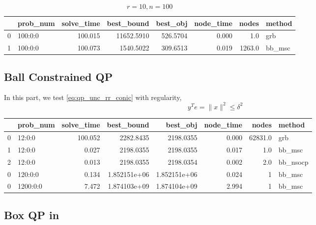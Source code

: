 \documentclass[a4paper, 10pt]{article}
\begin{document}
\begin{table}[h!]
    \begin{tabular}{llrrrrrl}
        \toprule
        {} & prob\_num & solve\_time & best\_bound & best\_obj & node\_time & nodes  & method  \\
        \midrule
        0  & 100:0:0   & 100.015     & 11652.5910  & 526.5704  & 0.000      & 1.0    & grb     \\
        1  & 100:0:0   & 100.073     & 1540.5022   & 309.6513  & 0.019      & 1263.0 & bb\_msc \\
        \bottomrule
    \end{tabular}
    \caption{\(r=10, n=100\)}
\end{table}
\normalsize

\subsection{Ball Constrained QP}
In this part, we test \eqref{eq:qp_unc_rr_conic} with regularity,
\begin{equation}
    y^Te = \|x\|^2 \le \delta^2
\end{equation}
\scriptsize
\begin{table}[h!]
    \begin{tabular}{llrrrrrl}
        \toprule
        {} & prob\_num & solve\_time & best\_bound  & best\_obj    & node\_time & nodes   & method    \\
        \midrule
        0  & 12:0:0    & 100.052     & 2282.8435    & 2198.0355    & 0.000      & 62831.0 & grb       \\
        1  & 12:0:0    & 0.027       & 2198.0355    & 2198.0355    & 0.017      & 1.0     & bb\_msc   \\
        2  & 12:0:0    & 0.013       & 2198.0355    & 2198.0354    & 0.002      & 2.0     & bb\_nsocp \\
        \midrule
        0  & 120:0:0   & 0.134       & 1.852151e+06 & 1.852151e+06 & 0.024      & 1       & bb\_msc   \\
        \midrule
        0  & 1200:0:0  & 7.472       & 1.874103e+09 & 1.874104e+09 & 2.994      & 1       & bb\_msc   \\
        \bottomrule
    \end{tabular}
\end{table}
\normalsize

\subsection{Box QP in \cite{luo_new_2019}}
\end{document}
